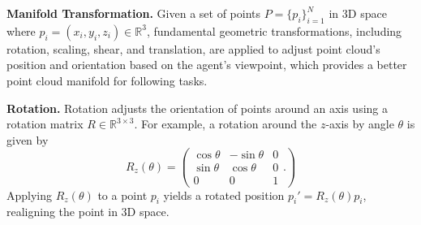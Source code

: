 
\noindent \textbf{Manifold Transformation.}
Given a set of points \( P = \{p_i\}_{i=1}^N \) in 3D space where \( p_i = (x_i, y_i, z_i) \in \mathbb{R}^3 \), fundamental geometric transformations, including rotation, scaling, shear, and translation, are applied to adjust point cloud's position and orientation based on the agent's viewpoint, which provides a better point cloud manifold for following tasks.

\noindent\textbf{Rotation.}
Rotation adjusts the orientation of points around an axis using a rotation matrix \( R \in \mathbb{R}^{3 \times 3} \). For example, a rotation around the \(z\)-axis by angle \(\theta\) is given by
\begin{equation} \label{eq:rot_z}
    R_z(\theta) = 
    \left(
    \begin{matrix}
        \cos \theta & -\sin \theta & 0 \\
        \sin \theta & \cos \theta & 0 \\
        0 & 0 & 1
    \end{matrix}.
    \right)
\end{equation}
Applying \( R_z(\theta) \) to a point \( p_i \) yields a rotated position \( p_i' = R_z(\theta) p_i \), realigning the point in 3D space.

